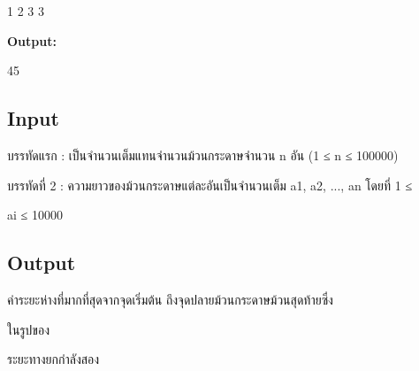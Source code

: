 \documentclass{article}
\begin{document}
1 2 3 3



\textbf{Output:}



45



\subsection*{Input}
บรรทัดแรก : เป็นจำนวนเต็มแทนจำนวนม้วนกระดาษจำนวน n อัน (1 ≤ n ≤ 100000)



บรรทัดที่ 2 : ความยาวของม้วนกระดาษแต่ละอันเป็นจำนวนเต็ม a1, a2, ..., an โดยที่ 1 ≤

ai ≤ 10000



\subsection*{Output}
{ค่าระยะห่างที่มากที่สุดจากจุดเริ่มต้น ถึงจุดปลายม้วนกระดาษม้วนสุดท้ายซึ่ง{ในรูปของ

ระยะทางยกกำลังสอง}}\\
\end{document}
